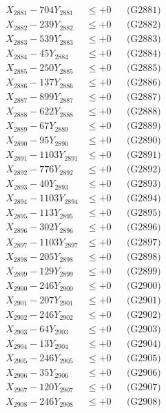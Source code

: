 \documentclass[a4paper,10pt]{article}
\begin{document}
{\begin{align}
\allowbreak
X_{2881} - 704Y_{2881} &\leq +0 && \text{(G2881)} \\
X_{2882} - 239Y_{2882} &\leq +0 && \text{(G2882)} \\
X_{2883} - 539Y_{2883} &\leq +0 && \text{(G2883)} \\
X_{2884} - 45Y_{2884} &\leq +0 && \text{(G2884)} \\
X_{2885} - 250Y_{2885} &\leq +0 && \text{(G2885)} \\
X_{2886} - 137Y_{2886} &\leq +0 && \text{(G2886)} \\
X_{2887} - 899Y_{2887} &\leq +0 && \text{(G2887)} \\
X_{2888} - 622Y_{2888} &\leq +0 && \text{(G2888)} \\
X_{2889} - 67Y_{2889} &\leq +0 && \text{(G2889)} \\
X_{2890} - 95Y_{2890} &\leq +0 && \text{(G2890)} \\
\allowbreak
X_{2891} - 1103Y_{2891} &\leq +0 && \text{(G2891)} \\
X_{2892} - 776Y_{2892} &\leq +0 && \text{(G2892)} \\
X_{2893} - 40Y_{2893} &\leq +0 && \text{(G2893)} \\
X_{2894} - 1103Y_{2894} &\leq +0 && \text{(G2894)} \\
X_{2895} - 113Y_{2895} &\leq +0 && \text{(G2895)} \\
X_{2896} - 302Y_{2896} &\leq +0 && \text{(G2896)} \\
X_{2897} - 1103Y_{2897} &\leq +0 && \text{(G2897)} \\
X_{2898} - 205Y_{2898} &\leq +0 && \text{(G2898)} \\
X_{2899} - 129Y_{2899} &\leq +0 && \text{(G2899)} \\
X_{2900} - 246Y_{2900} &\leq +0 && \text{(G2900)} \\
\allowbreak
X_{2901} - 207Y_{2901} &\leq +0 && \text{(G2901)} \\
X_{2902} - 246Y_{2902} &\leq +0 && \text{(G2902)} \\
X_{2903} - 64Y_{2903} &\leq +0 && \text{(G2903)} \\
X_{2904} - 13Y_{2904} &\leq +0 && \text{(G2904)} \\
X_{2905} - 246Y_{2905} &\leq +0 && \text{(G2905)} \\
X_{2906} - 35Y_{2906} &\leq +0 && \text{(G2906)} \\
X_{2907} - 120Y_{2907} &\leq +0 && \text{(G2907)} \\
X_{2908} - 246Y_{2908} &\leq +0 && \text{(G2908)} \\

\end{align}}
\end{document}
